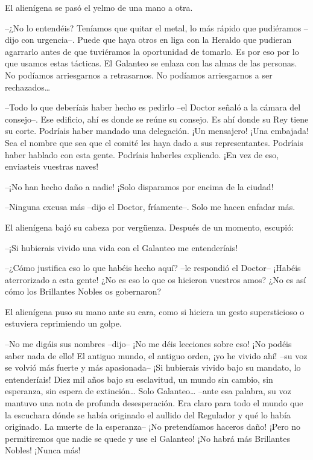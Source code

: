 {El alienígena se pasó el yelmo de una mano a otra.}

{--¿No lo entendéis? Teníamos que quitar el metal, lo más rápido que
	pudiéramos --dijo con urgencia--. Puede que haya otros en liga con la
	Heraldo que pudieran agarrarlo antes de que tuviéramos la oportunidad de
	tomarlo. Es por eso por lo que usamos estas tácticas. El Galanteo se
	enlaza con las almas de las personas. No podíamos arriesgarnos a
	retrasarnos. No podíamos arriesgarnos a ser rechazados\ldots{}}

{--Todo lo que deberíais haber hecho es pedirlo --el Doctor señaló a
	la cámara del consejo--. Ese edificio, ahí es donde se reúne su consejo.
	Es ahí donde su Rey tiene su corte. Podríais haber mandado una
	delegación. ¡Un mensajero! ¡Una embajada! Sea el nombre que sea que el
	comité les haya dado a sus representantes. Podríais haber hablado con
	esta gente. Podríais haberles explicado. ¡En vez de eso, enviasteis
vuestras naves!}

{--¡No han hecho daño a nadie! ¡Solo disparamos por encima de la
ciudad!}

{--Ninguna excusa más --dijo el Doctor, fríamente--. Solo me hacen
enfadar más.}

{El alienígena bajó su cabeza por vergüenza. Después de un momento,
escupió:}

{--¡Si hubierais vivido una vida con el Galanteo me entenderíais!}

{--¿Cómo justifica eso lo que habéis hecho aquí? --le respondió el
	Doctor-- ¡Habéis aterrorizado a esta gente! ¿No es eso lo que os
	hicieron vuestros amos? ¿No es así cómo los Brillantes Nobles os
gobernaron?}

{El alienígena puso su mano ante su cara, como si hiciera un gesto
supersticioso o estuviera reprimiendo un golpe.}

{--No me digáis sus nombres --dijo-- ¡No me déis lecciones sobre eso!
	¡No podéis saber nada de ello! El antiguo mundo, el antiguo orden, ¡yo
	he vivido ahí! --su voz se volvió más fuerte y más apasionada-- ¡Si
	hubierais vivido bajo su mandato, lo entenderíais! Diez mil años bajo su
	esclavitud, un mundo sin cambio, sin esperanza, sin espera de
	extinción\ldots{} Solo Galanteo\ldots{} --ante esa palabra, su voz
	mantuvo una nota de profunda desesperación. Era claro para todo el mundo
	que la escuchara dónde se había originado el aullido del Regulador y qué
	lo había originado. La muerte de la esperanza-- ¡No pretendíamos haceros
	daño! ¡Pero no permitiremos que nadie se quede y use el Galanteo! ¡No
habrá más Brillantes Nobles! ¡Nunca más!}

